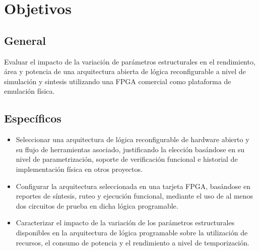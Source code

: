 \section{Objetivos}

\subsection{General}
            Evaluar el impacto de la variación de parámetros estructurales en el 
            rendimiento, área y potencia de una arquitectura abierta de lógica 
            reconfigurable a nivel de simulación y sintesis utilizando una 
            FPGA comercial como plataforma de emulación física.
\subsection{Específicos}
	\begin{itemize}
                \item Seleccionar una arquitectura de lógica reconfigurable de hardware 
                abierto y su flujo de herramientas asociado, justificando la elección 
                basándose en su nivel de parametrización, soporte de verificación funcional 
                e historial de implementación física en otros proyectos.

                \item Configurar la arquitectura seleccionada en una tarjeta 
                FPGA, basándose en reportes de síntesis, ruteo y ejecución 
                funcional, mediante el uso de al menos dos circuitos de prueba en dicha 
                lógica programable.
                             
                \item Caracterizar el impacto de la variación de los parámetros 
                estructurales disponibles en la arquitectura de lógica programable sobre 
                la utilización de recursos, el consumo de potencia y el rendimiento a nivel 
                de temporización.
    \end{itemize}



